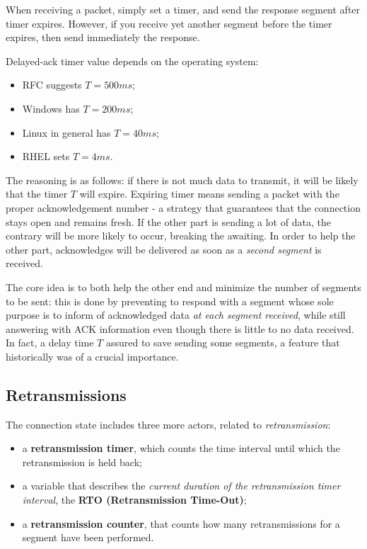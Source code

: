 \documentclass[10pt]{\classname}
\begin{document}
When receiving a packet, simply set a timer, and send the response segment
after timer expires. However, if you receive yet another segment before the
timer expires, then send immediately the response.

Delayed-ack timer value depends on the operating system:

\begin{itemize}
    \item RFC suggests $T = 500ms$;
    \item Windows has $T = 200ms$;
    \item Linux in general has $T = 40ms$;
    \item RHEL sets $T = 4ms$.
\end{itemize}

The reasoning is as follows: if there is not much data to transmit, it will be
likely that the timer $T$ will expire. Expiring timer means sending a packet
with the proper acknowledgement number \-- a strategy that guarantees that the
connection stays open and remains fresh. If the other part is sending a lot of
data, the contrary will be more likely to occur, breaking the awaiting. In
order to help the other part, acknowledges will be delivered as soon as a
\emph{second segment} is received. 

The core idea is to both help the other end and
minimize the number of segments to be sent: this is done by preventing to
respond with a segment whose sole purpose is to inform of acknowledged data
\emph{at each segment received}, while still answering with ACK information
even though there is little to no data received. In fact, a delay time $T$
assured to save sending some segments, a feature that historically was of a
crucial importance.

\subsection{Retransmissions}

The connection state includes three more actors, related to
\emph{retransmission}:

\begin{itemize}
    \item a \textbf{retransmission timer}, which counts the time interval until
        which the retransmission is held back;
	\item a variable that describes the \emph{current duration of the retransmission
        timer interval}, the \textbf{RTO (Retransmission Time-Out)};
    \item a \textbf{retransmission counter}, that counts how many
        retransmissions for a segment have been performed.
\end{itemize}
\end{document}
